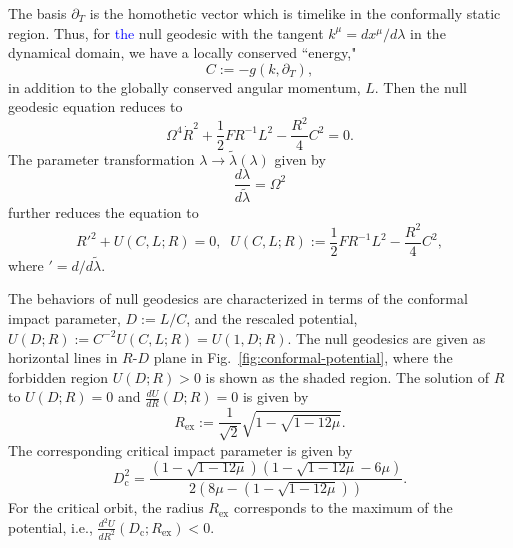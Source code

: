 \documentclass[prd,showpacs,preprintnumbers,groupedaddress,superscriptaddress,nofootinbib,11pt]{revtex4-1} %
\theoremstyle{newplain}
\newcommand{\blue}[1]{\textcolor{blue}{#1}}
\newcommand{\mr}[1]{\mathrm{#1}}
\begin{document}
\par
The basis $\partial_T$ is the homothetic vector which is timelike in the conformally static region.
Thus, for \blue{the} null geodesic with the tangent $k^\mu=dx^\mu/d\lambda$ in the dynamical domain, we have a locally conserved ``energy,"
\begin{equation}
\label{eq:def-conformal-energy}
C:=-g(k,\partial_T),
\end{equation}
in addition to the globally conserved angular momentum, $L$.
Then the null geodesic equation reduces to
\begin{equation}
\Omega^4\dot{R}^2+\frac{1}{2}FR^{-1}L^2-\frac{R^2}{4}C^2=0.
\end{equation}
The parameter transformation $\lambda\to\widetilde{\lambda}(\lambda)$ given by
\begin{equation}
\frac{d\lambda}{d\widetilde{\lambda}}=\Omega^2
\end{equation}
further reduces the equation to
\begin{equation}
\label{eq:conformal-pontial-problem}
{R'}^2+U(C,L;R)=0,\;\;U(C,L;R):=\frac{1}{2}FR^{-1}L^2-\frac{R^2}{4}C^2,
\end{equation}
where ${}'=d/d\widetilde{\lambda}$.
\par
The behaviors of null geodesics are characterized in terms of the conformal impact parameter, $D:=L/C$, and the rescaled potential, $U(D;R):=C^{-2}U(C,L;R)=U(1,D;R)$.
The null geodesics are given as horizontal lines in $R$-$D$ plane in Fig.~\ref{fig:conformal-potential}, where the forbidden region $U(D;R)>0$ is shown as the shaded region.
The solution of $R$ to $U(D;R)=0$ and $\frac{dU}{dR}(D;R)=0$ is given by
\begin{equation}
R_{\mr{ex}}:=\frac{1}{\sqrt{2}}\sqrt{1- \sqrt{1-12\mu}}.
\end{equation}
The corresponding critical impact parameter is given by
\begin{equation}
D_\text{c}^2=\frac{(1-\sqrt{1-12\mu})(1-\sqrt{1-12\mu}-6\mu)}{2(8\mu-(1-\sqrt{1-12\mu}))}.
\end{equation}
For the critical orbit, the radius $R_{\mr{ex}}$ corresponds to the maximum of the potential, i.e., $\frac{d^2U}{dR^2}(D_\text{c};R_{\mr{ex}})<0$.
\end{document}
